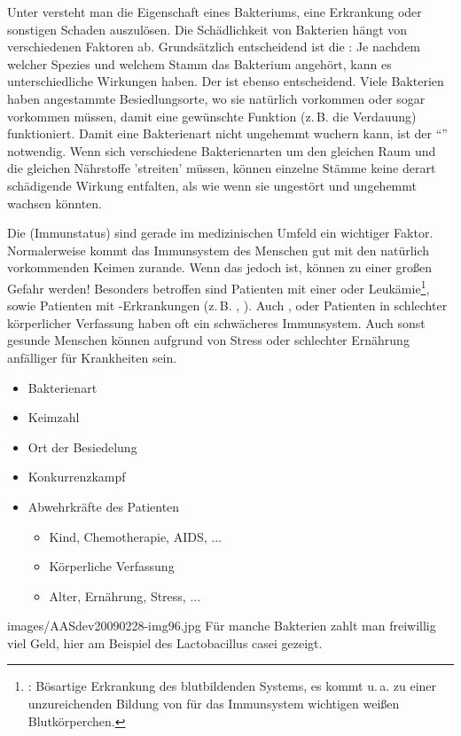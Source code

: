 {%
Unter  versteht man die Eigenschaft eines
Bakteriums, eine Erkrankung oder sonstigen Schaden
auszulösen. Die Schädlichkeit von Bakterien hängt von
verschiedenen Faktoren ab. Grundsätzlich entscheidend ist
die : Je nachdem welcher Spezies und
welchem Stamm das Bakterium angehört, kann es
unterschiedliche Wirkungen haben. Der  ist ebenso entscheidend. Viele Bakterien haben
angestammte Besiedlungsorte, wo sie natürlich vorkommen oder
sogar vorkommen müssen, damit eine gewünschte Funktion
(z.\,B. die Verdauung) funktioniert. Damit eine Bakterienart
nicht ungehemmt wuchern kann, ist der
\enquote{} notwendig. Wenn
sich verschiedene Bakterienarten um den gleichen Raum und
die gleichen Nährstoffe 'streiten' müssen, können einzelne
Stämme keine derart schädigende Wirkung entfalten, als wie
wenn sie ungestört und ungehemmt wachsen könnten.

Die  (Immunstatus) sind
gerade im medizinischen Umfeld ein wichtiger Faktor.
Normalerweise kommt das Immunsystem des Menschen gut mit den
natürlich vorkommenden Keimen zurande. Wenn das
 jedoch  ist,
können   zu einer großen Gefahr
werden! Besonders betroffen sind Patienten mit einer
 oder
Leukämie\footnote{:
Bösartige Erkrankung des blutbildenden Systems, es kommt
u.\,a. zu einer unzureichenden Bildung von für das
Immunsystem wichtigen weißen Blutkörperchen.}, sowie
Patienten mit -Erkrankungen (z.\,B.
, ). Auch ,
 oder Patienten in schlechter
körperlicher Verfassung haben oft ein schwächeres
Immunsystem. Auch sonst gesunde Menschen können aufgrund von
Stress oder schlechter Ernährung anfälliger für Krankheiten
sein.
}{
\begin{itemize}
  \item Bakterienart
  \item Keimzahl
  \item Ort der Besiedelung
  \item Konkurrenzkampf
  \item Abwehrkräfte des Patienten
  \begin{itemize}
    \item Kind, Chemotherapie, AIDS, ...
    \item Körperliche Verfassung
    \item Alter, Ernährung, Stress, ...
  \end{itemize}
\end{itemize}
}
{images/AASdev20090228-img96.jpg}
{Für manche Bakterien zahlt man
    freiwillig viel Geld, hier am Beispiel des
    Lactobacillus casei gezeigt.}
{}



